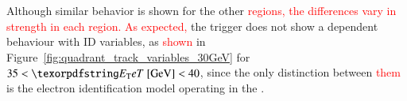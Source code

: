 Although similar behavior is shown for the other 
\textcolor{red}{regions, the differences vary in strength in each \abseta{} region. As expected, }
the trigger does not show a dependent behaviour with ID variables, as \textcolor{red}{shown} in Figure~\ref{fig:quadrant_track_variables_30GeV} for $35<\et{}~[\text{GeV}]<40$, since the only distinction between \textcolor{red}{them} is the electron identification model operating in the \fastcalo{}.


